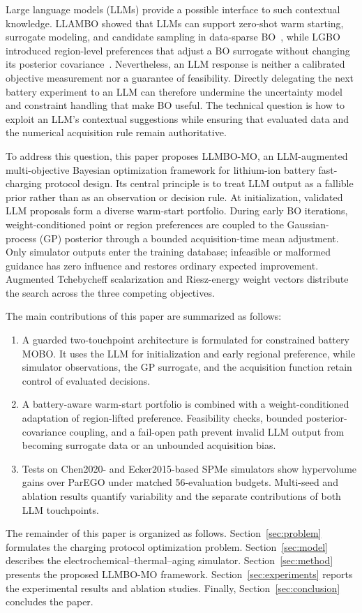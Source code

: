 Large language models (LLMs) provide a possible interface to such contextual
knowledge. LLAMBO showed that LLMs can support zero-shot warm starting,
surrogate modeling, and candidate sampling in data-sparse BO~\cite{ref10}, while
LGBO introduced region-level preferences that adjust a BO surrogate without
changing its posterior covariance~\cite{ref16}. Nevertheless, an LLM response is
neither a calibrated objective measurement nor a guarantee of feasibility.
Directly delegating the next battery experiment to an LLM can therefore
undermine the uncertainty model and constraint handling that make BO useful.
The technical question is how to exploit an LLM's contextual suggestions while
ensuring that evaluated data and the numerical acquisition rule remain
authoritative.

To address this question, this paper proposes LLMBO-MO, an LLM-augmented
multi-objective Bayesian optimization framework for lithium-ion battery
fast-charging protocol design. Its central principle is to treat LLM output as
a fallible prior rather than as an observation or decision rule. At
initialization, validated LLM proposals form a diverse warm-start portfolio.
During early BO iterations, weight-conditioned point or region preferences are
coupled to the Gaussian-process (GP) posterior through a bounded
acquisition-time mean adjustment. Only simulator outputs enter the training
database; infeasible or malformed guidance has zero influence and restores
ordinary expected improvement. Augmented Tchebycheff scalarization and
Riesz-energy weight vectors distribute the search across the three competing
objectives.

The main contributions of this paper are summarized as follows:
\begin{enumerate}
\item A guarded two-touchpoint architecture is formulated for constrained
battery MOBO. It uses the LLM for initialization and early regional preference,
while simulator observations, the GP surrogate, and the acquisition function
retain control of evaluated decisions.

\item A battery-aware warm-start portfolio is combined with a weight-conditioned
adaptation of region-lifted preference. Feasibility checks, bounded
posterior-covariance coupling, and a fail-open path prevent invalid LLM output
from becoming surrogate data or an unbounded acquisition bias.

\item Tests on Chen2020- and Ecker2015-based SPMe simulators show hypervolume
gains over ParEGO under matched 56-evaluation budgets. Multi-seed and ablation
results quantify variability and the separate contributions of both LLM
touchpoints.
\end{enumerate}

The remainder of this paper is organized as follows. Section~\ref{sec:problem}
formulates the charging protocol optimization problem. Section~\ref{sec:model}
describes the electrochemical--thermal--aging simulator. Section~\ref{sec:method}
presents the proposed LLMBO-MO framework. Section~\ref{sec:experiments} reports
the experimental results and ablation studies. Finally,
Section~\ref{sec:conclusion} concludes the paper.

